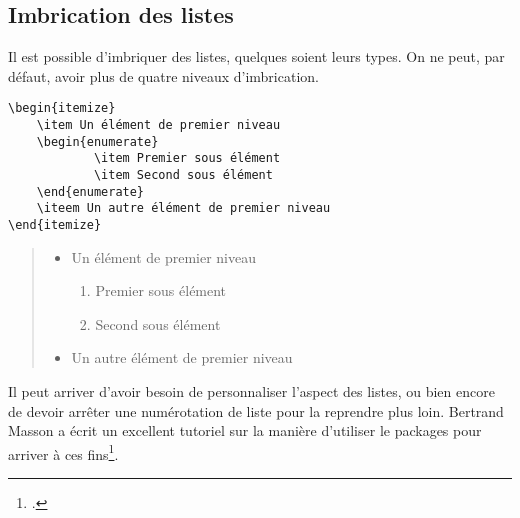 \subsection{Imbrication des listes}

Il est possible d'imbriquer des listes, quelques soient leurs types. On ne peut, par défaut, avoir plus de quatre niveaux d'imbrication.

\begin{verbatim}
\begin{itemize}
	\item Un élément de premier niveau
	\begin{enumerate}
			\item Premier sous élément
			\item Second sous élément
	\end{enumerate}
	\iteem Un autre élément de premier niveau
\end{itemize}
\end{verbatim}
\begin{quotation}
\noindent\begin{itemize}
	\item Un élément de premier niveau
	\begin{enumerate}
			\item Premier sous élément
			\item Second sous élément
	\end{enumerate}
	\item Un autre élément de premier niveau
\end{itemize}
\end{quotation}

\begin{anedocte}
Il peut arriver d'avoir besoin de personnaliser l'aspect des listes, ou bien encore de devoir arrêter une numérotation de liste pour la reprendre plus loin. Bertrand Masson a écrit un excellent tutoriel sur la manière d'utiliser le packages  pour arriver à ces fins\footcite{bebert_liste}. 
\end{anedocte}

